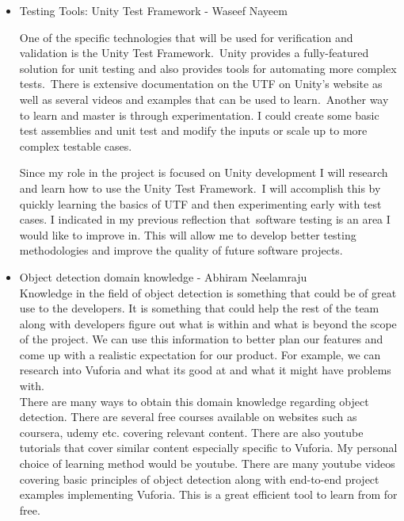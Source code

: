 \documentclass[12pt, titlepage]{article}
\begin{document}
\begin{itemize}
	\item Testing Tools: Unity Test Framework - Waseef Nayeem
	
	One of the specific technologies that will be used for verification and validation is the Unity Test Framework.\
	Unity provides a fully-featured solution for unit testing and also provides tools for automating more complex tests.\
	There is extensive documentation on the UTF on Unity's website as well as several videos and examples that can be used to learn.\
	Another way to learn and master is through experimentation. I could create some basic test assemblies and unit test and modify the inputs or scale up to more complex testable cases.

	Since my role in the project is focused on Unity development I will research and learn how to use the Unity Test Framework.\
	I will accomplish this by quickly learning the basics of UTF and then experimenting early with test cases. I indicated in my previous reflection that\
	software testing is an area I would like to improve in. This will allow me to develop better testing methodologies and improve the quality of future software projects.

\end{itemize}

\begin{itemize}

	\item Object detection domain knowledge - Abhiram Neelamraju \\
	
	Knowledge in the field of object detection is something that could be of great use to the developers. It is something that could help the rest of the team along with developers figure out what is within and what is beyond the scope of the project.
	We can use this information to better plan our features and come up with a realistic expectation for our product. For example, we can research into Vuforia and what its good at and what it might have problems with. \\

	There are many ways to obtain this domain knowledge regarding object detection. There are several free courses available on websites such as coursera, udemy etc. covering relevant content. There are also youtube tutorials that cover similar content especially specific to Vuforia. 
	My personal choice of learning method would be youtube. There are many youtube videos covering basic principles of object detection along with end-to-end project examples implementing Vuforia. This is a great efficient tool to learn from for free.

\end{itemize}
\end{document}
